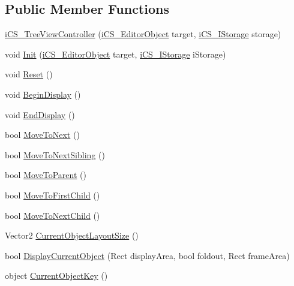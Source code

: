 \subsection*{Public Member Functions}
\begin{DoxyCompactItemize}
\item 
\hyperlink{classi_c_s___tree_view_controller_afd491c9dcd0ab88f3fee400caffcae86}{i\+C\+S\+\_\+\+Tree\+View\+Controller} (\hyperlink{classi_c_s___editor_object}{i\+C\+S\+\_\+\+Editor\+Object} target, \hyperlink{classi_c_s___i_storage}{i\+C\+S\+\_\+\+I\+Storage} storage)
\item 
void \hyperlink{classi_c_s___tree_view_controller_a28537ed9660b2d294b02114809579d76}{Init} (\hyperlink{classi_c_s___editor_object}{i\+C\+S\+\_\+\+Editor\+Object} target, \hyperlink{classi_c_s___i_storage}{i\+C\+S\+\_\+\+I\+Storage} i\+Storage)
\item 
void \hyperlink{classi_c_s___tree_view_controller_ababb7abffe6f342fb47b5b1ce46ff6c0}{Reset} ()
\item 
void \hyperlink{classi_c_s___tree_view_controller_a342da52c301a2e1427112dce741f6cab}{Begin\+Display} ()
\item 
void \hyperlink{classi_c_s___tree_view_controller_a586128c6364a5e2b607720ba2be5babc}{End\+Display} ()
\item 
bool \hyperlink{classi_c_s___tree_view_controller_a97f5f4735ad79898aa97e44ec52424ea}{Move\+To\+Next} ()
\item 
bool \hyperlink{classi_c_s___tree_view_controller_a7d193229e59e677c9d867285db4323ff}{Move\+To\+Next\+Sibling} ()
\item 
bool \hyperlink{classi_c_s___tree_view_controller_ac82a1cba3f1c63c51dde72d3b6a0ed29}{Move\+To\+Parent} ()
\item 
bool \hyperlink{classi_c_s___tree_view_controller_aee7fd9b2a7169a882d09834d0b3f79ad}{Move\+To\+First\+Child} ()
\item 
bool \hyperlink{classi_c_s___tree_view_controller_a0e72ecf58c38c480bf7fc4e32cb8af8b}{Move\+To\+Next\+Child} ()
\item 
Vector2 \hyperlink{classi_c_s___tree_view_controller_a8c4a06b6d272d47e135900310a54571f}{Current\+Object\+Layout\+Size} ()
\item 
bool \hyperlink{classi_c_s___tree_view_controller_ae94fe4904adff309444f540c8dac9325}{Display\+Current\+Object} (Rect display\+Area, bool foldout, Rect frame\+Area)
\item 
object \hyperlink{classi_c_s___tree_view_controller_a24b9d79d871bd7dec8c1dc37fc83feb3}{Current\+Object\+Key} ()

\end{DoxyCompactItemize}
